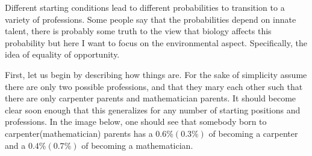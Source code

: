 \documentclass{report}
\begin{document}

Different starting conditions lead to different probabilities to transition to a variety of professions. Some people say that the probabilities depend on innate talent, there is probably some truth to the view that biology affects this probability but here I want to focus on the environmental aspect. Specifically, the idea of equality of opportunity.

First, let us begin by describing how things are. For the sake of simplicity assume there are only two possible professions, and that they mary each other such that there are only carpenter parents and mathematician parents. It should become clear soon enough that this generalizes for any number of starting positions and professions. In the image below, one should see that somebody born to carpenter(mathematician) parents has a $0.6\%(0.3\%)$ of becoming a carpenter and a $0.4\%(0.7\%)$ of becoming a mathematician. 

\end{document}
